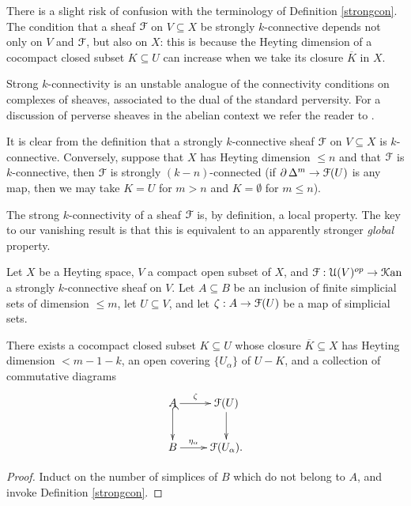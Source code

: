 \begin{remark}
There is a slight risk of confusion with the terminology of Definition \ref{strongcon}.
The condition that a sheaf $\operatorname{\mathcal{F}}$ on $V \subseteq X$ be strongly $k$-connective
depends not only on $V$ and $\operatorname{\mathcal{F}}$, but also on $X$: this is because the Heyting dimension of 
a cocompact closed subset $K \subseteq U$ can increase when we take its closure $\overline{K}$ in $X$.
\end{remark}

\begin{remark}
Strong $k$-connectivity is an unstable analogue of the
connectivity conditions on complexes of sheaves, associated to the dual of the standard perversity. For a discussion of perverse sheaves in the
abelian context we refer the reader to \cite{deligne}.
\end{remark}

\begin{remark}
It is clear from the definition that a strongly $k$-connective sheaf $\operatorname{\mathcal{F}}$ on $V \subseteq X$
is $k$-connective. Conversely, suppose that $X$ has Heyting dimension $\leq n$ and that
$\operatorname{\mathcal{F}}$ is $k$-connective, then $\operatorname{\mathcal{F}}$ is strongly $(k-n)$-connected (if $\operatorname{\partial} \Delta^{m} \rightarrow \operatorname{\mathcal{F}}(U)$ is any map, then we may take $K=U$ for $m > n$ and $K = \emptyset$ for $m \leq n$).
\end{remark}

The strong $k$-connectivity of a sheaf $\operatorname{\mathcal{F}}$ is, by definition, a
local property. The key to our vanishing result is that this is
equivalent to an apparently stronger {\it global} property.

\begin{lemma}\label{precheesit}
Let $X$ be a Heyting space, $V$ a compact open subset of $X$, and
$\operatorname{\mathcal{F}}: \operatorname{\mathcal{U}}(V)^{op} \rightarrow \operatorname{\mathcal{K}an}$ a strongly $k$-connective sheaf on $V$.
Let $A \subseteq B$ be an inclusion of finite simplicial sets of dimension $\leq m$, 
let $U \subseteq V$, and let $\zeta: A \rightarrow \operatorname{\mathcal{F}}(U)$ be a map of simplicial sets.

There exists a cocompact closed subset $K \subseteq U$ whose closure
$\overline{K} \subseteq X$ has Heyting dimension $< m-1-k$, an open covering
$\{ U_{\alpha} \} $ of $U - K$, and a collection of commutative diagrams
$$ \xymatrix{ A \ar@{^{(}->}[d] \ar[r]^-{\zeta} & \calF(U) \ar[d] \\
B \ar[r]^-{\eta_{\alpha}} & \calF( U_{\alpha} ). }$$
\end{lemma}

\begin{proof}
Induct on the number of simplices of $B$ which do not belong to $A$, and invoke Definition \ref{strongcon}.
\end{proof}

